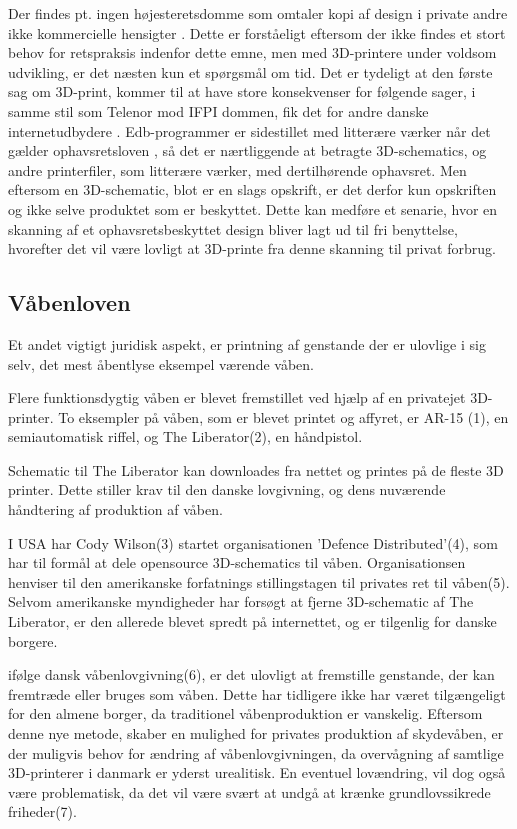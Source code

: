 Der findes pt. ingen højesteretsdomme som omtaler kopi af design i private andre ikke kommercielle hensigter \autocite{domstol.dk_domme_????}. Dette er forståeligt eftersom der ikke findes et stort behov for retspraksis indenfor dette emne, men med 3D-printere under voldsom udvikling, er det næsten kun et spørgsmål om tid. Det er tydeligt at den første sag om 3D-print, kommer til at have store konsekvenser for følgende sager, i samme stil som Telenor mod IFPI dommen, fik det for andre danske internetudbydere \autocite{casper_ulsoe_pirate_2010}.
Edb-programmer er sidestillet med litterære værker når det gælder ophavsretsloven \autocite{retsinformation.dk_ophavsretsloven_2010}, så det er nærtliggende at betragte 3D-schematics, og andre printerfiler, som litterære værker, med dertilhørende ophavsret. Men eftersom en 3D-schematic, blot er en slags opskrift, er det derfor kun opskriften og ikke selve produktet som er beskyttet. Dette kan medføre et senarie, hvor en skanning af et ophavsretsbeskyttet design bliver lagt ud til fri benyttelse, hvorefter det vil være lovligt at 3D-printe fra denne skanning til privat forbrug.

\subsection{Våbenloven}

Et andet vigtigt juridisk aspekt, er printning af genstande der er ulovlige i sig selv, det mest åbentlyse eksempel værende våben.

Flere funktionsdygtig våben er blevet fremstillet ved hjælp af en privatejet 3D-printer. To eksempler på våben, som er blevet printet og affyret, er AR-15 (1), en semiautomatisk riffel, og The Liberator(2), en håndpistol. 

Schematic til The Liberator kan downloades fra nettet og printes på de fleste 3D printer. Dette stiller krav til den danske lovgivning, og dens nuværende håndtering af produktion af våben.

I USA har Cody Wilson(3) startet organisationen 'Defence Distributed'(4), som har til formål at dele opensource 3D-schematics til våben. Organisationsen henviser til den amerikanske forfatnings stillingstagen til privates ret til våben(5). Selvom amerikanske myndigheder har forsøgt at fjerne 3D-schematic af The Liberator, er den allerede blevet spredt på internettet, og er tilgenlig for danske borgere.

ifølge dansk våbenlovgivning(6), er det ulovligt at fremstille genstande, der kan fremtræde eller bruges som våben. Dette har tidligere ikke har været tilgængeligt for den almene borger, da traditionel våbenproduktion er vanskelig. Eftersom denne nye metode, skaber en mulighed for privates produktion af skydevåben, er der muligvis behov for ændring af våbenlovgivningen, da overvågning af samtlige 3D-printerer i danmark er yderst urealitisk. En eventuel lovændring, vil dog også være problematisk, da det vil være svært at undgå at krænke grundlovssikrede friheder(7).

